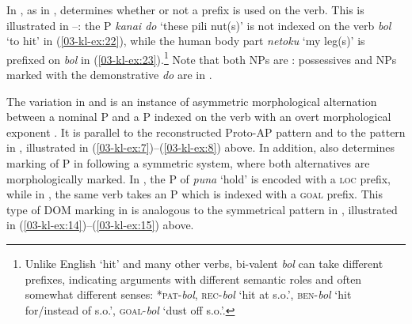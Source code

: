 \documentclass[output=paper]{LSP/langsci}
\begin{document}
In , as in ,  determines whether or not a prefix is
used on the verb. This is illustrated in --: the  P \textit{kanai do} ‘these pili nut(s)’ is not indexed on the verb \textit{bol} ‘to hit’ in (\ref{03-kl-ex:22}), while the human body part \textit{netoku} ‘my leg(s)’ is prefixed on \textit{bol} in (\ref{03-kl-ex:23}).\footnote{Unlike English ‘hit’ and many other verbs,  bi-valent \textit{bol} can take different prefixes, indicating arguments with different semantic roles and often somewhat different senses: *\textsc{pat}-\textit{bol}, \textsc{rec}-\textit{bol} ‘hit at s.o.’, \textsc{ben}-\textit{bol} ‘hit for/instead of s.o.’, \textsc{goal}-\textit{bol} ‘dust off s.o.’.} Note that both NPs are : possessives and NPs marked with the demonstrative \textit{do} are  in  \citep{Kratochviletal2015Definiteness}.


The variation in  and  is an instance of asymmetric morphological alternation between a nominal P and a P indexed on the verb with an overt morphological exponent .  It is parallel to the reconstructed Proto-AP pattern and to the pattern in , illustrated in (\ref{03-kl-ex:7})--(\ref{03-kl-ex:8}) above. In addition,  also determines marking of P in  following a symmetric system, where both alternatives are morphologically marked. In , the  P of \emph{puna} `hold' is encoded with a \textsc{loc} prefix, while in , the same verb takes an  P which is indexed with a \textsc{goal} prefix. This type of DOM marking in  is analogous to the symmetrical pattern in , illustrated in (\ref{03-kl-ex:14})--(\ref{03-kl-ex:15}) above.
\end{document}
